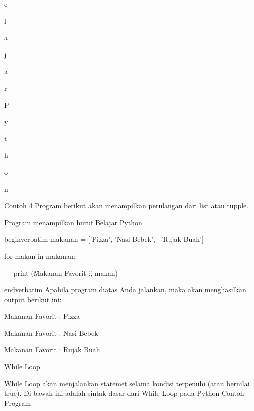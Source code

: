 e \par
l \par
a \par
j \par
a \par
r \par
  \par
P \par
y \par
t \par
h \par
o \par
n \par
\vspace{12pt}
Contoh 4\vspace{\baselineskip}
\vspace{\baselineskip}
Program berikut akan menampilkan perulangan dari list atau tupple.\vspace{\baselineskip}
\vspace{\baselineskip}
 \par
Program menampilkan huruf Belajar Python \par
\vspace{12pt}
begin{verbatim}
makanan = ['Pizza', 'Nasi Bebek',~ 'Rujak Buah'] \par
for makan in makanan: \par
~~ print (\"Makanan Favorit :\", makan) \par
end{verbatim}
\vspace{12pt}
Apabila program diatas Anda jalankan, maka akan menghasilkan output berikut ini:\vspace{\baselineskip}
\vspace{\baselineskip}
 \par
Makanan Favorit : Pizza \par
Makanan Favorit : Nasi Bebek \par
Makanan Favorit : Rujak Buah \par
\vspace{12pt}
\vspace{\baselineskip}
\vspace{12pt}
While Loop \par
While Loop akan menjalankan statemet selama kondisi terpenuhi (atau bernilai true).\vspace{\baselineskip}
\vspace{\baselineskip}
Di bawah ini adalah sintak dasar dari While Loop pada Python\vspace{\baselineskip}
\vspace{\baselineskip}
Contoh Program\vspace{\baselineskip}
